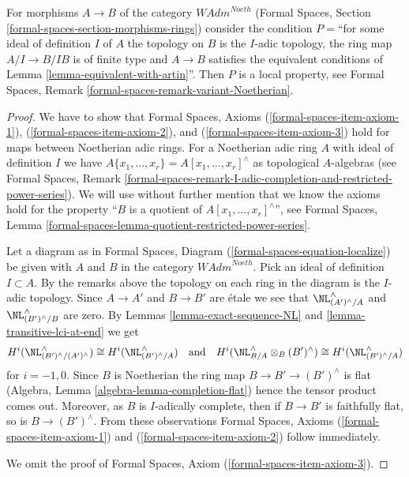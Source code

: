 \begin{lemma}
\label{lemma-rig-etale-axioms}
For morphisms $A \to B$ of the category $\textit{WAdm}^{Noeth}$
(Formal Spaces, Section \ref{formal-spaces-section-morphisms-rings})
consider the condition $P=$``for some ideal of definition $I$ of $A$
the topology on $B$ is the $I$-adic topology, the ring map $A/I \to B/IB$
is of finite type and $A \to B$ satisfies the equivalent conditions of
Lemma \ref{lemma-equivalent-with-artin}''. Then $P$ is a local property, see
Formal Spaces, Remark \ref{formal-spaces-remark-variant-Noetherian}.
\end{lemma}

\begin{proof}
We have to show that Formal Spaces, Axioms (\ref{formal-spaces-item-axiom-1}),
(\ref{formal-spaces-item-axiom-2}), and (\ref{formal-spaces-item-axiom-3})
hold for maps between Noetherian adic rings. For a Noetherian adic ring
$A$ with ideal of definition $I$ we have
$A\{x_1, \ldots, x_r\} = A[x_1, \ldots, x_r]^\wedge$ as topological
$A$-algebras (see Formal Spaces, Remark
\ref{formal-spaces-remark-I-adic-completion-and-restricted-power-series}).
We will use without further mention that we know the axioms hold
for the property ``$B$ is a quotient of $A[x_1, \ldots, x_r]^\wedge$'', see
Formal Spaces, Lemma
\ref{formal-spaces-lemma-quotient-restricted-power-series}.

\medskip\noindent
Let a diagram as in
Formal Spaces, Diagram (\ref{formal-spaces-equation-localize})
be given with $A$ and $B$ in the category $\textit{WAdm}^{Noeth}$.
Pick an ideal of definition $I \subset A$. By the remarks above
the topology on each ring in the diagram is the $I$-adic topology.
Since $A \to A'$ and $B \to B'$ are \'etale we see that
$\NL_{(A')^\wedge/A}^\wedge$ and $\NL_{(B')^\wedge/B}^\wedge$
are zero. By Lemmas \ref{lemma-exact-sequence-NL} and
\ref{lemma-transitive-lci-at-end} we get
$$
H^i(\NL_{(B')^\wedge/(A')^\wedge}^\wedge)
\cong
H^i(\NL_{(B')^\wedge/A}^\wedge)
\quad\text{and}\quad
H^i(\NL_{B/A}^\wedge \otimes_B (B')^\wedge) \cong
H^i(\NL_{(B')^\wedge/A}^\wedge)
$$
for $i = -1, 0$. Since $B$ is Noetherian the ring map
$B \to B' \to (B')^\wedge$ is flat
(Algebra, Lemma \ref{algebra-lemma-completion-flat})
hence the tensor product comes out. Moreover, as $B$ is
$I$-adically complete, then if $B \to B'$ is faithfully flat,
so is $B \to (B')^\wedge$. From these observations
Formal Spaces, Axioms (\ref{formal-spaces-item-axiom-1})
and (\ref{formal-spaces-item-axiom-2}) follow immediately.

\medskip\noindent
We omit the proof of Formal Spaces, Axiom (\ref{formal-spaces-item-axiom-3}).
\end{proof}

